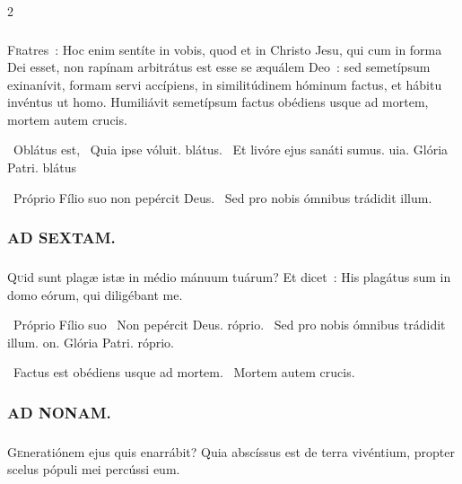 \documentclass[9pt,twoside]{extarticle}
\begin{document}
\begin{multicols}{2}
{\subsubsection*{}
\lettrine{F}ratres~: Hoc enim sentíte in vobis, quod et in Christo Jesu, qui cum in forma Dei esset, non rapínam arbitrátus est esse se æquálem Deo~: sed semetípsum exinanívit, formam servi accípiens, in similitúdinem hóminum factus, et hábitu invéntus ut homo. Humiliávit semetípsum factus obédiens usque ad mortem, mortem autem crucis.

\begin{tightlist}{}
\item {}~Oblátus est, \textred{*}~Quia ipse vóluit. blátus. ~Et livóre ejus sanáti sumus. uia. Glória Patri. blátus 
\item {}~Próprio Fílio suo non pepércit Deus. ~Sed pro nobis ómnibus trádidit illum.
\end{tightlist}

\subsubsection*{\center \textsc{AD SEXTAM.}}
\subsubsection*{}
\lettrine{Q}uid sunt plagæ istæ in médio mánuum tuárum? Et dicet~: His plagátus sum in domo eórum, qui diligébant me.

\begin{tightlist}{}
\item {}~Próprio Fílio suo \textred{*}~Non pepércit Deus. róprio. ~Sed pro nobis ómnibus trádidit illum. on. Glória Patri. róprio.
\item {}~Factus est obédiens usque ad mortem. ~Mortem autem crucis.
\end{tightlist}

\subsubsection*{\center \textsc{AD NONAM.}}
\subsubsection*{}
\lettrine{G}eneratiónem ejus quis enarrábit? Quia abscíssus est de terra vivéntium, propter scelus pópuli mei percússi eum.

}
\end{multicols}
\end{document}
